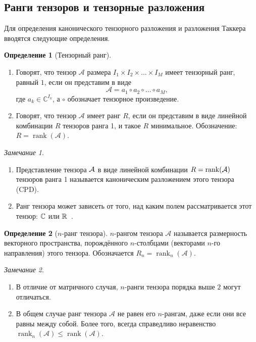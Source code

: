 \documentclass[specialist,
    substylefile = spbu.rtx,
    subf,href,colorlinks=true, 12pt]{disser}
\theoremstyle{plain}
\theoremstyle{definition}
\newtheorem{definition}{Определение}[section]
\theoremstyle{remark}
\newtheorem*{remark}{Замечание}
\begin{document}
    \subsection{Ранги тензоров и тензорные разложения}\label{subsec:tensor-ranks}
    Для определения канонического тензорного разложения и разложения Таккера вводятся следующие определения.
    \newpage
    \begin{definition}[Тензорный ранг]
        \leavevmode
        \begin{enumerate}
            \item Говорят, что тензор $\mathcal{A}$ размера $I_1\times I_2\times \ldots \times I_M$ имеет тензорный ранг, равный $1$, если он представим в виде
            \[
            \mathcal{A}=a_1\circ a_2\circ \ldots \circ a_M,
            \]
            где $a_{k} \in \mathbb{C}^{I_k}$, а $\circ$ обозначает тензорное произведение.
            \item Говорят, что тензор $\mathcal{A}$ имеет ранг $R$, если он представим в виде линейной комбинации $R$ тензоров
            ранга 1, и такое $R$ минимальное.
            Обозначение: $R=\operatorname{rank}(\mathcal{A})$.
        \end{enumerate}
    \end{definition}
    \begin{remark} 
        \begin{enumerate}
            \item Представление тензора $\mathcal{A}$ в виде линейной комбинации $R = \operatorname{rank}(\mathcal{A})$ тензоров ранга 1 называется каноническим разложением этого тензора (CPD).
            \item Ранг тензора может зависеть от того, над каким полем рассматривается этот тензор:
            $\mathbb{C}$ или $\mathbb{R}$~\cite{tensors-bg}.
        \end{enumerate}
    \end{remark}
    
    \begin{definition}[$n$-ранг тензора]
        $n$-рангом тензора $\mathcal{A}$ называется размерность векторного пространства, порождённого 
        $n$-столбцами (векторами $n$-го направления) этого тензора.
        Обозначается $R_n=\operatorname{rank}_{n}(\mathcal{A})$.
    \end{definition}
    
    \begin{remark}
        \begin{enumerate}
            \item В отличие от матричного случая, $n$-ранги тензора порядка выше $2$ могут отличаться.
            \item В общем случае ранг тензора $\mathcal{A}$ не равен его $n$-рангам, даже если они все равны между
            собой.
            Более того, всегда справедливо неравенство 
            $\operatorname{rank}_n(\mathcal{A})\leqslant \operatorname{rank}(\mathcal{A})$.
        \end{enumerate}
    \end{remark}
    
\end{document}
